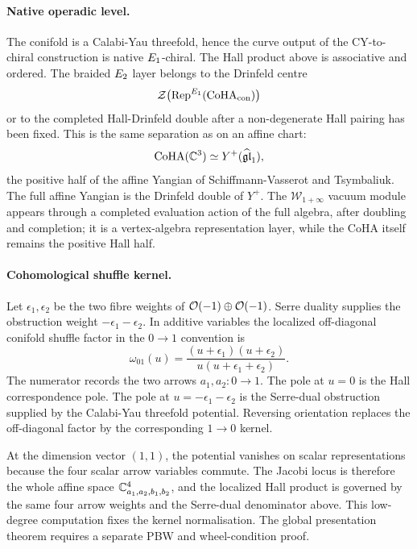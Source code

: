 \paragraph{Native operadic level.}
The conifold is a Calabi-Yau threefold, hence the curve output of the
CY-to-chiral construction is native \(E_1\)-chiral.  The Hall product
above is associative and ordered.  The braided \(E_2\) layer belongs to
the Drinfeld centre
\[
  \mathcal{Z}\bigl(\mathrm{Rep}^{E_1}(\mathrm{CoHA}_{\mathrm{con}})\bigr)
\]
or to the completed Hall-Drinfeld double after a non-degenerate Hall
pairing has been fixed.  This is the same separation as on an affine
chart:
\[
  \mathrm{CoHA}(\mathbb{C}^3)\simeq Y^+(\widehat{\mathfrak{gl}}_1),
\]
the positive half of the affine Yangian of Schiffmann-Vasserot and
Tsymbaliuk.  The full affine Yangian is the Drinfeld double of
\(Y^+\).  The \(\mathcal W_{1+\infty}\) vacuum module appears through a
completed evaluation action of the full algebra, after doubling and
completion; it is a vertex-algebra representation layer, while the CoHA
itself remains the positive Hall half.

\paragraph{Cohomological shuffle kernel.}
Let \(\epsilon_1,\epsilon_2\) be the two fibre weights of
\(\mathcal{O}(-1)\oplus\mathcal{O}(-1)\).  Serre duality supplies the obstruction weight
\(-\epsilon_1-\epsilon_2\).  In additive variables the localized
off-diagonal conifold shuffle factor in the \(0\to 1\) convention is
\[
  \omega_{01}(u)
  =
  \frac{(u+\epsilon_1)(u+\epsilon_2)}
       {u(u+\epsilon_1+\epsilon_2)} .
\]
The numerator records the two arrows \(a_1,a_2:0\to 1\).  The pole at
\(u=0\) is the Hall correspondence pole.  The pole at
\(u=-\epsilon_1-\epsilon_2\) is the Serre-dual obstruction supplied by
the Calabi-Yau threefold potential.  Reversing orientation replaces the
off-diagonal factor by the corresponding \(1\to 0\) kernel.

At the dimension vector \((1,1)\), the potential vanishes on scalar
representations because the four scalar arrow variables commute.  The
Jacobi locus is therefore the whole affine space
\(\mathbb{C}^4_{a_1,a_2,b_1,b_2}\), and the localized Hall product is governed
by the same four arrow weights and the Serre-dual denominator above.
This low-degree computation fixes the kernel normalisation.  The global
presentation theorem requires a separate PBW and wheel-condition proof.

